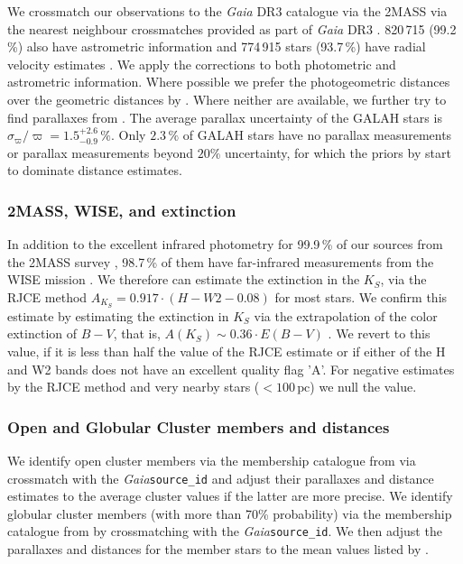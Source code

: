 \documentclass[
  journal=pasa,
  manuscript=research-paper, %
  year=2023,
  volume=37
]{cup-journal}
\newcommand{\Gaia}{\textit{Gaia}\xspace}
\begin{document}
We crossmatch our observations to the \Gaia DR3 catalogue \citep{Brown2021,Vallenari2022} via the 2MASS via the nearest neighbour crossmatches provided as part of \Gaia DR3 \citep{Torra2021}. 820\,715 (99.2\,\%) also have astrometric information \citep{Lindegren2021a} and 774\,915 stars (93.7\,\%) have radial velocity estimates \citep{Katz2022}. We apply the corrections to both photometric \citep{Riello2021} and astrometric \citep{Lindegren2021b}information. Where possible we prefer the photogeometric distances over the geometric distances by \citep{BailerJones2021}. Where neither are available, we further try to find parallaxes from \cite{vanLeeuwen2007}. The average parallax uncertainty of the GALAH stars is $\sigma_{\varpi} / \varpi = 1.5_{-0.9}^{+2.6}\,\mathrm{\%}$. Only $2.3\,\%$ of GALAH stars have no parallax measurements or parallax measurements beyond $20\%$ uncertainty, for which the priors by \citep{BailerJones2021} start to dominate distance estimates.

\subsubsection{2MASS, WISE, and extinction}

In addition to the excellent infrared photometry for 99.9\,\% of our sources from the 2MASS survey \citep{Skrutskie2006}, 98.7\,\% of them have far-infrared measurements from the WISE mission \citep{Cutri2013}. We therefore can estimate the extinction in the $K_S$, via the RJCE method \citep{Majewski2011} $A_{K_S}  = 0.917 \cdot \left( H - W2 - 0.08 \right)$ for most stars. We confirm this estimate by estimating the extinction in $K_S$ via the extrapolation of the color extinction of $B-V$, that is, $A(K_S) \sim 0.36 \cdot E(B-V)$ \citep{Cardelli1989}. We revert to this value, if it is less than half the value of the RJCE estimate or if either of the H and W2 bands does not have an excellent quality flag 'A'. For negative estimates by the RJCE method and very nearby stars ($<100\,\mathrm{pc}$) we null the value.

\subsubsection{Open and Globular Cluster members and distances} \label{sec:oc_gc}

We identify open cluster members via the membership catalogue from \citet{CantatGaudin2020} via crossmatch with the \Gaia \texttt{source\_id} and adjust their parallaxes and distance estimates to the average cluster values if the latter are more precise. We identify globular cluster members (with more than 70\% probability) via the membership catalogue from \citet{Vasiliev2021} by crossmatching with the \Gaia \texttt{source\_id}. We then adjust the parallaxes and distances for the member stars to the mean values listed by \citet{Baumgardt2021}.
\end{document}
